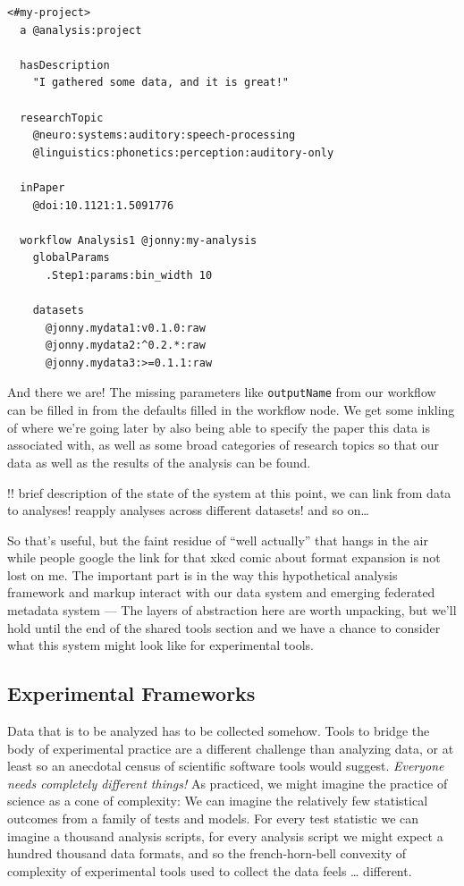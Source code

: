 \documentclass[notoc]{tufte-book}
\begin{document}
\begin{verbatim}
<#my-project>
  a @analysis:project

  hasDescription
    "I gathered some data, and it is great!"

  researchTopic
    @neuro:systems:auditory:speech-processing
    @linguistics:phonetics:perception:auditory-only

  inPaper
    @doi:10.1121:1.5091776 

  workflow Analysis1 @jonny:my-analysis
    globalParams
      .Step1:params:bin_width 10

    datasets
      @jonny.mydata1:v0.1.0:raw
      @jonny.mydata2:^0.2.*:raw
      @jonny.mydata3:>=0.1.1:raw
\end{verbatim}

And there we are! The missing parameters like \texttt{outputName} from
our workflow can be filled in from the defaults filled in the workflow
node. We get some inkling of where we're going later by also being able
to specify the paper this data is associated with, as well as some broad
categories of research topics so that our data as well as the results of
the analysis can be found.

!! brief description of the state of the system at this point, we can
link from data to analyses! reapply analyses across different datasets!
and so on\ldots{}

So that's useful, but the faint residue of ``well actually'' that hangs
in the air while people google the link for that xkcd comic about format
expansion is not lost on me. The important part is in the way this
hypothetical analysis framework and markup interact with our data system
and emerging federated metadata system --- The layers of abstraction
here are worth unpacking, but we'll hold until the end of the shared
tools section and we have a chance to consider what this system might
look like for experimental tools.






\subsection{Experimental Frameworks}



 Data that is to be analyzed has to be collected somehow.
Tools to bridge the body of experimental practice are a different
challenge than analyzing data, or at least so an anecdotal census of
scientific software tools would suggest. \emph{Everyone needs completely
different things!} As practiced, we might imagine the practice of
science as a cone of complexity: We can imagine the relatively few
statistical outcomes from a family of tests and models. For every test
statistic we can imagine a thousand analysis scripts, for every analysis
script we might expect a hundred thousand data formats, and so the
french-horn-bell convexity of complexity of experimental tools used to
collect the data feels \ldots{} different.
\end{document}
